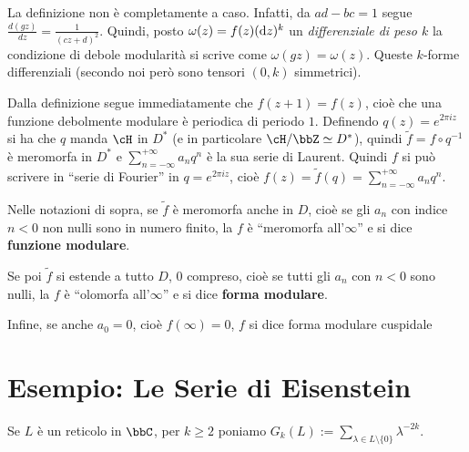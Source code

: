 \begin{osservazione}
	La definizione non è completamente a caso. Infatti, da $a d - bc = 1$ segue $\displaystyle{\frac{d(gz)}{dz} = \frac{1}{(cz+d)^2}}$. Quindi, posto $\omega(z) = f(z)(\text{d} z)^k$ un \emph{differenziale di peso $k$} la condizione di debole modularità si scrive come $\omega(g z) = \omega(z)$. Queste $k$-forme differenziali (secondo noi però sono tensori $(0, k)$ simmetrici).
\end{osservazione}

\begin{osservazione}
Dalla definizione segue immediatamente che $f(z+1)=f(z)$, cioè che una
funzione debolmente modulare è periodica di periodo $1$. Definendo $q(z) = e^{2 \pi i z}$
si ha che $q$ manda $\cH$ in $D^*$ (e in particolare $\cH / \bbZ \simeq D^*$), quindi
$\widetilde{f} = f \circ q^{-1}$ è meromorfa in $D^*$ e
$\displaystyle{\sum^{+\infty}_{n=-\infty}{a_n q^n}}$ è la sua serie di Laurent.
Quindi $f$ si può scrivere in ``serie di Fourier'' in $q=e^{2 \pi i z}$, cioè
$\displaystyle{f(z)=\widetilde{f}(q)=\sum^{+\infty}_{n=-\infty}{a_n q^n}}$.
\end{osservazione}

\begin{definizione}
Nelle notazioni di sopra, se $\widetilde{f}$ è meromorfa anche in $D$, cioè
se gli $a_n$ con indice $n<0$ non nulli sono in numero finito, la $f$
è ``meromorfa all'$\infty$'' e si dice {\bf funzione modulare}.

Se poi $\widetilde{f}$ si estende a tutto $D$, $0$ compreso, cioè se tutti gli $a_n$ con $n < 0$
sono nulli, la $f$ è ``olomorfa all'$\infty$'' e si dice {\bf forma modulare}.

Infine, se anche $a_0 = 0$, cioè $f(\infty) = 0$, $f$ si dice forma modulare
cuspidale
\end{definizione}

\section{Esempio: Le Serie di Eisenstein}

\begin{definizione}
Se $L$ è un reticolo in $\bbC$, per $k \geq 2$ poniamo
$G_k(L):=\displaystyle{\sum_{\lambda \in L \setminus \{ 0 \}}{\lambda ^{-2k}}}$.
\end{definizione}

